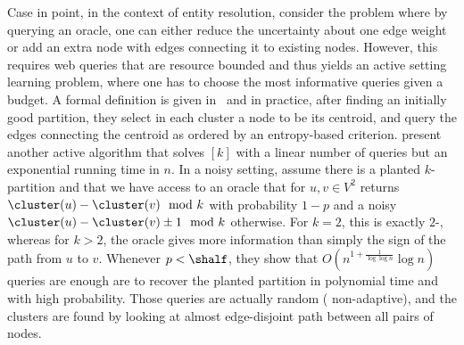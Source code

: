 
Case in point, in the context of entity resolution, \textcite{activeCoref07} consider the \pcc{}
problem where by querying an oracle, one can either reduce the uncertainty about one edge weight or
add an extra node with edges connecting it to existing nodes. However, this requires web queries
that are resource bounded and thus yields an active setting learning problem, where one has to
choose the most informative
queries given a budget. A formal definition is given in~\autocite{queryMoreEdgeCC07} and in
practice, after finding an initially good partition, they select in each cluster a node to be its
centroid, and query the edges connecting the centroid as ordered by an entropy-based criterion.
\textcite[Section 5]{Ailon2014} present another active algorithm that solves \mind$[k]$ with a
linear number of queries but an exponential running time in $n$.  In a noisy setting,
\textcite{Mitzenmacher2016} assume there is a planted $k$-partition and that we have access to an
oracle that for $u,v\in V^2$ returns $\cluster(u) - \cluster(v) \mod k$ with probability $1-p$ and a
noisy $\cluster(u) - \cluster(v) \pm 1 \mod k$ otherwise. For $k=2$, this is exactly $2$-\pcc{},
whereas for $k>2$, the oracle gives more information than simply the sign of the path from $u$ to
$v$. Whenever
$p < \shalf$, they show that $O(n^{1+\frac{1}{\log\log n}}\log n)$ queries are enough are to recover
the planted partition in polynomial time and with high probability. Those queries are actually
random (\ie{} non-adaptive), and the clusters are found by looking at almost edge-disjoint path
between all pairs of nodes.

